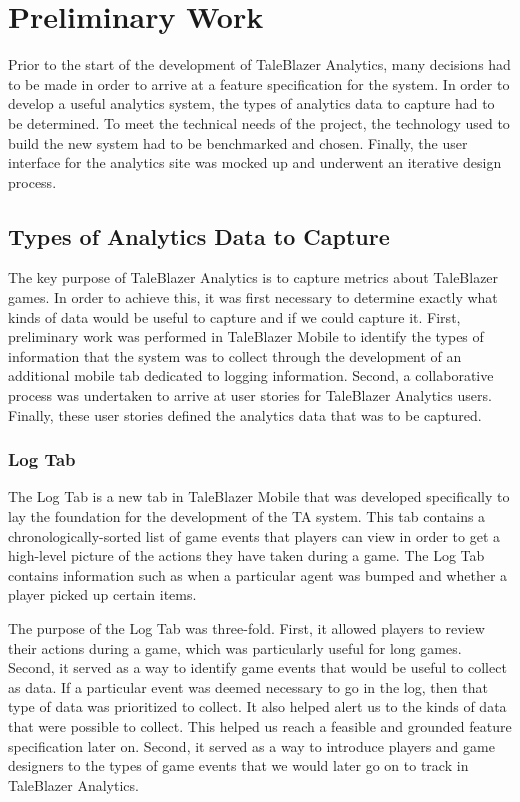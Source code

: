 \chapter{Preliminary Work}

Prior to the start of the development of TaleBlazer Analytics, many decisions had to be made in order to arrive at a feature specification for the system. In order to develop a useful analytics system, the types of analytics data to capture had to be determined. To meet the technical needs of the project, the technology used to build the new system had to be benchmarked and chosen. Finally, the user interface for the analytics site was mocked up and underwent an iterative design process.

\section{Types of Analytics Data to Capture}

The key purpose of TaleBlazer Analytics is to capture metrics about TaleBlazer games. In order to achieve this, it was first necessary to determine exactly what kinds of data would be useful to capture and if we could capture it. First, preliminary work was performed in TaleBlazer Mobile to identify the types of information that the system was to collect through the development of an additional mobile tab dedicated to logging information. Second, a collaborative process was undertaken to arrive at user stories for TaleBlazer Analytics users. Finally, these user stories defined the analytics data that was to be captured. 

\subsection{Log Tab}

The Log Tab is a new tab in TaleBlazer Mobile that was developed specifically to lay the foundation for the development of the TA system. This tab contains a chronologically-sorted list of game events that players can view in order to get a high-level picture of the actions they have taken during a game. The Log Tab contains information such as when a particular agent was bumped and whether a player picked up certain items. 

The purpose of the Log Tab was three-fold. First, it allowed players to review their actions during a game, which was particularly useful for long games. Second, it served as a way to identify game events that would be useful to collect as data. If a particular event was deemed necessary to go in the log, then that type of data was prioritized to collect. It also helped alert us to the kinds of data that were possible to collect. This helped us reach a feasible and grounded feature specification later on. Second, it served as a way to introduce players and game designers to the types of game events that we would later go on to track in TaleBlazer Analytics.

